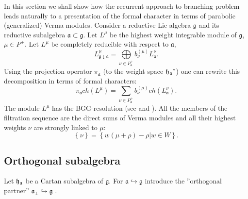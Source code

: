 \documentclass[12pt]{article}
\theoremstyle{definition}
\newcommand{\gf}{\mathfrak{g}}
\newcommand{\af}{\mathfrak{a}}
\begin{document}
In this section we shall show how the recurrent approach to branching
problem leads naturally to a presentation of the formal character in terms
of parabolic (generalized) Verma modules. Consider a reductive Lie algebra $%
\gf$ and its reductive subalgebra $\af\subset \gf$. Let $%
L^{\mu} $ be the highest weight integrable module of $\gf$, $\mu \in
P^{+}$. Let $L^{\mu }$ be completely reducible with respect to $\af$,
\begin{equation*}
L_{\gf\downarrow \af}^{\mu }=\bigoplus\limits_{\nu \in P_{\af%
}^{+}}b_{\nu }^{\left( \mu \right) }L_{\af}^{\nu }.
\end{equation*}
Using the projection operator $\pi _{\af}$ (to the weight space $\frak{%
h_{a}}^{\ast }$) one can rewrite this decomposition in terms of formal
characters:
\begin{equation}
\pi _{\af}ch\left( L^{\mu }\right) =\sum_{\nu \in P_{\af%
}^{+}}b_{\nu }^{(\mu )}ch\left( L_{\af}^{\nu }\right) .
\label{branching1}
\end{equation}
The module $L^{\mu }$ has the BGG-resolution (see \cite
{bernstein1976category,bernstein1975differential,bernstein1971structure} and
\cite{humphreys2008representations}). All the members of the filtration
sequence are the direct sums of Verma modules and all their highest weights $%
\nu $ are strongly linked to $\mu $:
\begin{equation*}
\left\{ \nu \right\} =\left\{ w\left( \mu +\rho \right) -\rho |w\in
W\right\} .
\end{equation*}

\subsection{Orthogonal subalgebra}

Let $\frak{h}_{\af}$ be a Cartan subalgebra of $\mathfrak{g}$. For $%
\mathfrak{a}\hookrightarrow \gf$ introduce the ''orthogonal partner'' $%
\mathfrak{a}_{\bot }\hookrightarrow \gf$ .
\end{document}
